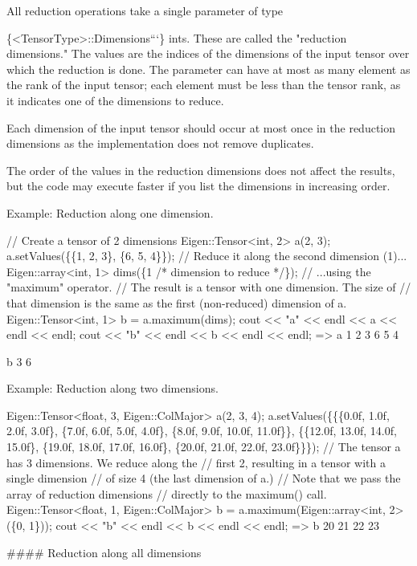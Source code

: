 All reduction operations take a single parameter of type 
\begin{DoxyCode}
\{<TensorType>::Dimensions```\}
ints.  These are called the "reduction dimensions."  The values are the indices
of the dimensions of the input tensor over which the reduction is done.  The
parameter can have at most as many element as the rank of the input tensor;
each element must be less than the tensor rank, as it indicates one of the
dimensions to reduce.

Each dimension of the input tensor should occur at most once in the reduction
dimensions as the implementation does not remove duplicates.

The order of the values in the reduction dimensions does not affect the
results, but the code may execute faster if you list the dimensions in
increasing order.

Example: Reduction along one dimension.

    // Create a tensor of 2 dimensions
    Eigen::Tensor<int, 2> a(2, 3);
    a.setValues(\{\{1, 2, 3\}, \{6, 5, 4\}\});
    // Reduce it along the second dimension (1)...
    Eigen::array<int, 1> dims(\{1 /* dimension to reduce */\});
    // ...using the "maximum" operator.
    // The result is a tensor with one dimension.  The size of
    // that dimension is the same as the first (non-reduced) dimension of a.
    Eigen::Tensor<int, 1> b = a.maximum(dims);
    cout << "a" << endl << a << endl << endl;
    cout << "b" << endl << b << endl << endl;
    =>
    a
    1 2 3
    6 5 4

    b
    3
    6

Example: Reduction along two dimensions.

    Eigen::Tensor<float, 3, Eigen::ColMajor> a(2, 3, 4);
    a.setValues(\{\{\{0.0f, 1.0f, 2.0f, 3.0f\},
                  \{7.0f, 6.0f, 5.0f, 4.0f\},
                  \{8.0f, 9.0f, 10.0f, 11.0f\}\},
                 \{\{12.0f, 13.0f, 14.0f, 15.0f\},
                  \{19.0f, 18.0f, 17.0f, 16.0f\},
                  \{20.0f, 21.0f, 22.0f, 23.0f\}\}\});
    // The tensor a has 3 dimensions.  We reduce along the
    // first 2, resulting in a tensor with a single dimension
    // of size 4 (the last dimension of a.)
    // Note that we pass the array of reduction dimensions
    // directly to the maximum() call.
    Eigen::Tensor<float, 1, Eigen::ColMajor> b =
        a.maximum(Eigen::array<int, 2>(\{0, 1\}));
    cout << "b" << endl << b << endl << endl;
    =>
    b
    20
    21
    22
    23

#### Reduction along all dimensions


\end{DoxyCode}
